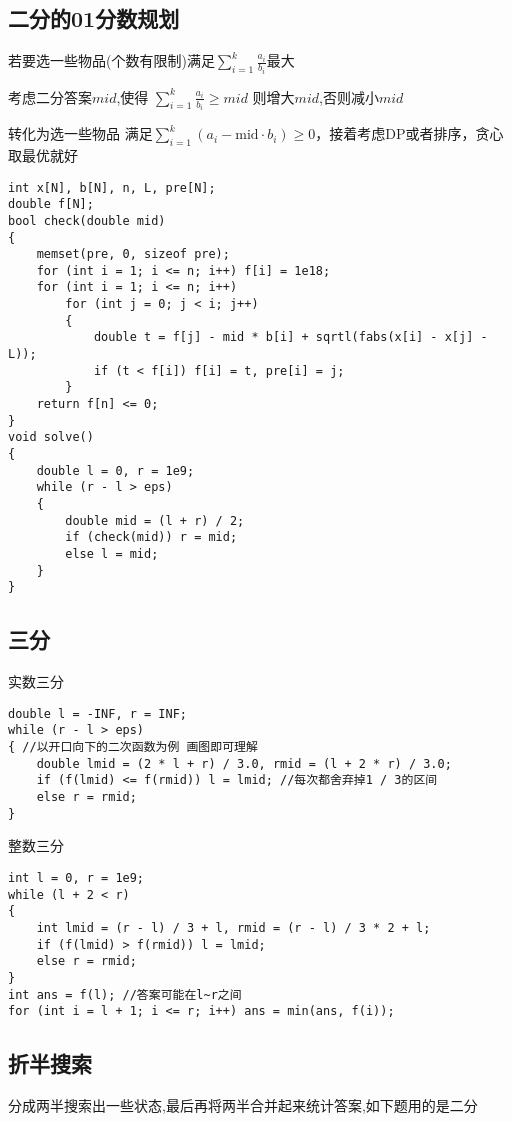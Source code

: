 \documentclass[a4paper, fontset=none]{ctexart}
\begin{document}
\subsection{二分的01分数规划}

若要选一些物品(个数有限制)满足$\sum\limits_{i=1}^k\frac{a_i}{b_i}$最大

考虑二分答案$mid$,使得 $\sum\limits_{i=1}^k\frac{a_i}{b_i}\ge mid$ 则增大$mid$,否则减小$mid$

转化为选一些物品 满足$\sum\limits_{i=1}^{k}(a_i-\text{mid} \cdot b_i)\geq 0$，接着考虑DP或者排序，贪心取最优就好

\begin{verbatim}
int x[N], b[N], n, L, pre[N];
double f[N];
bool check(double mid)
{
    memset(pre, 0, sizeof pre);
    for (int i = 1; i <= n; i++) f[i] = 1e18;
    for (int i = 1; i <= n; i++)
        for (int j = 0; j < i; j++)
        {
            double t = f[j] - mid * b[i] + sqrtl(fabs(x[i] - x[j] - L));
            if (t < f[i]) f[i] = t, pre[i] = j;
        }
    return f[n] <= 0;
}
void solve()
{
    double l = 0, r = 1e9;
    while (r - l > eps)
    {
        double mid = (l + r) / 2;
        if (check(mid)) r = mid;
        else l = mid;
    }
}
\end{verbatim}
\subsection{三分}

实数三分

\begin{verbatim}
double l = -INF, r = INF;
while (r - l > eps)
{ //以开口向下的二次函数为例 画图即可理解
    double lmid = (2 * l + r) / 3.0, rmid = (l + 2 * r) / 3.0;
    if (f(lmid) <= f(rmid)) l = lmid; //每次都舍弃掉1 / 3的区间
    else r = rmid;
}
\end{verbatim}

整数三分

\begin{verbatim}
int l = 0, r = 1e9;
while (l + 2 < r)
{
    int lmid = (r - l) / 3 + l, rmid = (r - l) / 3 * 2 + l;
    if (f(lmid) > f(rmid)) l = lmid;
    else r = rmid;
}
int ans = f(l); //答案可能在l~r之间
for (int i = l + 1; i <= r; i++) ans = min(ans, f(i));
\end{verbatim}
\subsection{折半搜索}

分成两半搜索出一些状态,最后再将两半合并起来统计答案,如下题用的是二分
\end{document}
